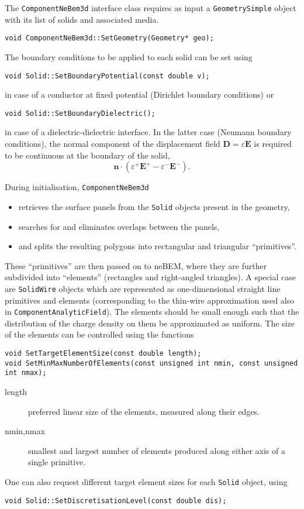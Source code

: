 The \texttt{ComponentNeBem3d} interface class requires as input a 
\texttt{GeometrySimple} object with its list of solids and associated 
media. 
\begin{lstlisting}
void ComponentNeBem3d::SetGeometry(Geometry* geo);
\end{lstlisting}
The boundary conditions to be applied to each solid can be set using
\begin{lstlisting}
void Solid::SetBoundaryPotential(const double v);
\end{lstlisting}
in case of a conductor at fixed potential (Dirichlet boundary conditions) 
or 
\begin{lstlisting}
void Solid::SetBoundaryDielectric();
\end{lstlisting}
in case of a dielectric-dielectric interface. 
In the latter case (Neumann boundary conditions), 
the normal component of the displacement field $\mathbf{D} = \varepsilon\mathbf{E}$ is required to be continuous at the boundary of the solid,
\begin{equation*}
  \mathbf{n}\cdot\left(\varepsilon^{+}\mathbf{E}^{+} - \varepsilon^{-}\mathbf{E}^{-}\right).
\end{equation*}

During initialisation, \texttt{ComponentNeBem3d}
\begin{itemize}
\item
retrieves the surface panels from the \texttt{Solid} objects 
present in the geometry,
\item
searches for and eliminates overlaps between the panels,  
\item
and splits the resulting polygons into rectangular and triangular ``primitives''.
\end{itemize}
These ``primitives'' are then passed on to neBEM, where they are further 
subdivided into ``elements'' (rectangles and right-angled triangles).
A special case are \texttt{SolidWire} objects which are represented 
as one-dimensional straight line primitives and elements 
(corresponding to the thin-wire approximation used also 
in \texttt{ComponentAnalyticField}). 
The elements should be small enough such that the distribution of the 
charge density on them be approximated as uniform.
The size of the elements can be controlled using the functions
\begin{lstlisting}
void SetTargetElementSize(const double length);
void SetMinMaxNumberOfElements(const unsigned int nmin, const unsigned int nmax);
\end{lstlisting}
\begin{description}
\item[length] preferred linear size of the elements, measured along their edges.
\item[nmin,nmax] smallest and largest number of elements produced along either axis of a single primitive.
\end{description}
One can also request different target element sizes for each 
\texttt{Solid} object, using
\begin{lstlisting}
void Solid::SetDiscretisationLevel(const double dis);
\end{lstlisting} 

